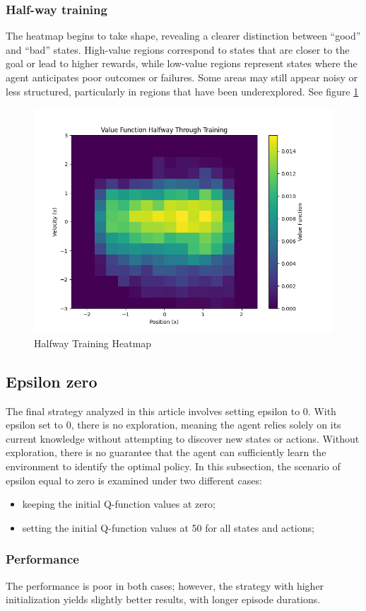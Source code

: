 \documentclass{article}
\begin{document}
\subsubsection{Half-way training}
The heatmap begins to take shape, revealing a clearer distinction between “good” and “bad” states. High-value regions correspond to states that are closer to the goal or lead to higher rewards, while low-value regions represent states where the agent anticipates poor outcomes or failures. Some areas may still appear noisy or less structured, particularly in regions that have been underexplored. See figure \ref{fig:heatmap_costant_half}
\begin{figure}[h]
	\centering
	\includegraphics[width=0.5\linewidth]{../data/plot/heatmap_halfway_constant_0.2.png}
	\caption{Halfway Training Heatmap}
	\label{fig:heatmap_costant_half}
\end{figure}


\subsection{Epsilon zero}
The final strategy analyzed in this article involves setting epsilon to 0. With epsilon set to 0, there is no exploration, meaning the agent relies solely on its current knowledge without attempting to discover new states or actions. Without exploration, there is no guarantee that the agent can sufficiently learn the environment to identify the optimal policy.
In this subsection, the scenario of epsilon equal to zero is examined under two different cases:
\begin{itemize}
	\item keeping the initial Q-function values at zero;
	\item setting the initial Q-function values at 50 for all states and actions;
\end{itemize}

\subsubsection{Performance}
The performance is poor in both cases; however, the strategy with higher initialization yields slightly better results, with longer episode durations.
\end{document}
